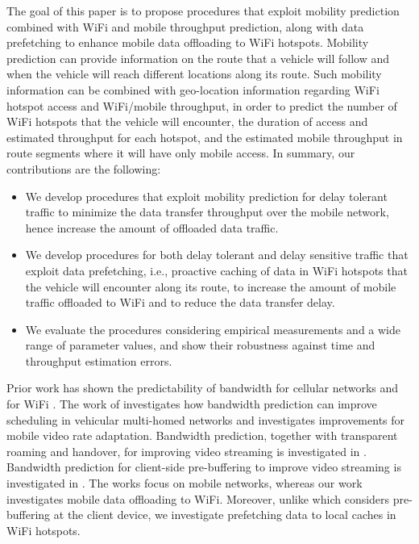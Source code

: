 \documentclass{sig-alternate}
\begin{document}
The goal of this paper is to propose procedures that exploit  mobility prediction combined with WiFi and mobile throughput prediction, along with data prefetching to enhance mobile data offloading  to WiFi hotspots. Mobility prediction can provide information on the route that a vehicle will follow and when the vehicle will reach different locations along its route. Such mobility information can be combined with geo-location information regarding WiFi hotspot access and WiFi/mobile throughput, in order to predict the number of WiFi hotspots that the vehicle will encounter,  the duration of access and estimated throughput for each hotspot, and the estimated mobile throughput in route segments where it will have only mobile access.
In summary, our contributions are the following:
\begin{itemize}[topsep=1pt, partopsep=1pt, itemsep=1pt,parsep=1pt]
\item We develop procedures that  exploit mobility prediction for delay tolerant traffic to minimize the data transfer throughput over the mobile network, hence increase the amount of offloaded data traffic.
\item We develop procedures for both delay tolerant and delay sensitive traffic that exploit data prefetching, i.e., proactive caching of data in WiFi hotspots that the vehicle will encounter along its route, to increase the amount of mobile traffic offloaded to WiFi and to reduce the data transfer delay.
\item We evaluate the procedures considering  empirical measurements and a wide range of parameter values, and show their robustness against time and throughput estimation errors.
\end{itemize}
Prior work has shown the predictability of bandwidth for cellular networks  \cite{Yao++08} and for WiFi \cite{Nic++08,Pan++09}. The work of \cite{Yao++09} investigates how bandwidth prediction can improve scheduling in vehicular multi-homed networks and
\cite{Yao++10} investigates improvements for mobile video rate adaptation.
Bandwidth prediction, together with transparent  roaming and handover, for improving video streaming is investigated in  \cite{Eve++11}.
Bandwidth prediction for client-side pre-buffering to improve video streaming is investigated in \cite{Sin++12}. The works \cite{Yao++10,Eve++11,Sin++12} focus on mobile networks, whereas our work investigates mobile data offloading to WiFi. Moreover, unlike \cite{Sin++12} which considers pre-buffering at the client device, we investigate  prefetching data to local caches in WiFi hotspots.
\end{document}
